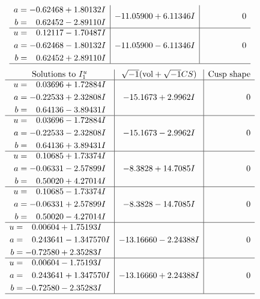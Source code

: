 \documentclass[1p]{elsarticle_modified}
\theoremstyle{definition}
\newcommand{\I}{\sqrt{-1}}
\begin{document}
$$\begin{array}{c|c|c}
\begin{aligned}
a &= -0.62468 + 1.80132 I \\
b &= \phantom{-}0.62452 - 2.89110 I\end{aligned}
 & -11.05900 + 6.11346 I & \phantom{-0.000000 } 0 \\ \hline\begin{aligned}
u &= \phantom{-}0.12117 - 1.70487 I \\
a &= -0.62468 - 1.80132 I \\
b &= \phantom{-}0.62452 + 2.89110 I\end{aligned}
 & -11.05900 - 6.11346 I & \phantom{-0.000000 } 0\\
 \hline 
 \end{array}$$\newpage$$\begin{array}{c|c|c}  
\text{Solutions to }I^u_{1}& \I (\text{vol} + \sqrt{-1}CS) & \text{Cusp shape}\\
 \hline 
\begin{aligned}
u &= \phantom{-}0.03696 + 1.72884 I \\
a &= -0.22533 + 2.32808 I \\
b &= \phantom{-}0.64136 - 3.89431 I\end{aligned}
 & -15.1673 + 2.9962 I & \phantom{-0.000000 } 0 \\ \hline\begin{aligned}
u &= \phantom{-}0.03696 - 1.72884 I \\
a &= -0.22533 - 2.32808 I \\
b &= \phantom{-}0.64136 + 3.89431 I\end{aligned}
 & -15.1673 - 2.9962 I & \phantom{-0.000000 } 0 \\ \hline\begin{aligned}
u &= \phantom{-}0.10685 + 1.73374 I \\
a &= -0.06331 - 2.57899 I \\
b &= \phantom{-}0.50020 + 4.27014 I\end{aligned}
 & -8.3828 + 14.7085 I & \phantom{-0.000000 } 0 \\ \hline\begin{aligned}
u &= \phantom{-}0.10685 - 1.73374 I \\
a &= -0.06331 + 2.57899 I \\
b &= \phantom{-}0.50020 - 4.27014 I\end{aligned}
 & -8.3828 - 14.7085 I & \phantom{-0.000000 } 0 \\ \hline\begin{aligned}
u &= \phantom{-}0.00604 + 1.75193 I \\
a &= \phantom{-}0.243641 - 1.347570 I \\
b &= -0.72580 + 2.35283 I\end{aligned}
 & -13.16660 - 2.24388 I & \phantom{-0.000000 } 0 \\ \hline\begin{aligned}
u &= \phantom{-}0.00604 - 1.75193 I \\
a &= \phantom{-}0.243641 + 1.347570 I \\
b &= -0.72580 - 2.35283 I\end{aligned}
 & -13.16660 + 2.24388 I & \phantom{-0.000000 } 0\\
 \hline 
 \end{array}$$\newpage\newpage\renewcommand{\arraystretch}{1}
\end{document}

